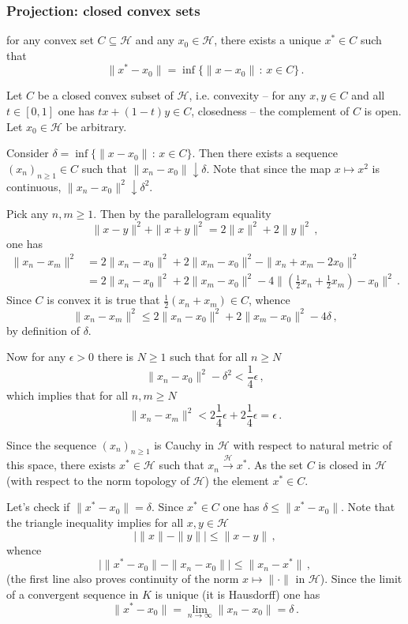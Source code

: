 \documentclass[a4paper]{article}
\newcommand{\Hcal}{\mathcal{H}}
\begin{document}
\subsubsection{Projection: closed convex sets} %
\label{ssub:closed_convex_projection}

for any convex set $C\subseteq \Hcal$ and any $x_0\in \Hcal$, there exists a unique
$x^*\in C$ such that 
\[ \|x^*-x_0\| = \inf\{\|x-x_0\|\,:\, x\in C\}\,. \]

Let $C$ be a closed convex subset of $\Hcal$, i.e. convexity -- for any $x,y\in C$
and all $t\in[0,1]$ one has $t x + (1-t) y \in C$, closedness -- the complement of 
$C$ is open. Let $x_0\in \Hcal$ be arbitrary.

Consider $\delta = \inf\{\|x-x_0\|\,:\,x\in C\}$. Then there exists a sequence
$(x_n)_{n\geq1}\in C$ such that $\|x_n-x_0\|\downarrow \delta$. Note that since
the map $x\mapsto x^2$ is continuous, $\|x_n-x_0\|^2\downarrow \delta^2$.

Pick any $n,m\geq1$. Then by the parallelogram equality
\[ \|x-y\|^2 + \|x+y\|^2 = 2\|x\|^2 + 2\|y\|^2\,, \]
one has
\begin{align*}
	\|x_n-x_m\|^2
	&= 2\|x_n-x_0\|^2 + 2\|x_m-x_0\|^2
	- \|x_n+x_m - 2 x_0\|^2\\
	&= 2\|x_n-x_0\|^2 + 2\|x_m-x_0\|^2
	- 4 \bigl\|(\tfrac{1}{2}x_n+\tfrac{1}{2}x_m) - x_0\bigr\|^2\,.
\end{align*}
Since $C$ is convex it is true that $\tfrac{1}{2}(x_n+x_m)\in C$, whence
\[ \|x_n-x_m\|^2 \leq 2\|x_n-x_0\|^2 + 2\|x_m-x_0\|^2 - 4\delta\,, \]
by definition of $\delta$.

Now for any $\epsilon>0$ there is $N\geq1$ such that for all $n\geq N$
\[ \|x_n-x_0\|^2-\delta^2 < \frac{1}{4} \epsilon\,, \]
which implies that for all $n,m\geq N$
\[
\|x_n-x_m\|^2 < 2 \frac{1}{4} \epsilon + 2 \frac{1}{4} \epsilon = \epsilon \,.
\]

Since the sequence $(x_n)_{n\geq1}$ is Cauchy in $\Hcal$ with respect to natural
metric of this space, there exists $x^*\in \Hcal$ such that $x_n\overset{\Hcal}{\to} x^*$.
As the set $C$ is closed in $\Hcal$ (with respect to the norm topology of $\Hcal$)
the element $x^*\in C$.

Let's check if $\|x^*-x_0\| = \delta$. Since $x^*\in C$ one has $\delta \leq \|x^*-x_0\|$.
Note that the triangle inequality implies for all $x,y\in\Hcal$
\[ \bigl\lvert \|x\| - \|y\| \bigr\rvert \leq \| x-y \|\,, \]
whence
\[
\bigl\lvert \|x^*-x_0\| - \|x_n-x_0\| \bigr\rvert \leq \|x_n-x^*\| \,,
\]
(the first line also proves continuity of the norm $x\mapsto \|\cdot\|$ in $\Hcal$).
Since the limit of a convergent sequence in $K$ is unique (it is Hausdorff) one has
\[  \|x^*-x_0\| = \lim_{n\to \infty} \|x_n-x_0\| = \delta \,. \]
\end{document}
